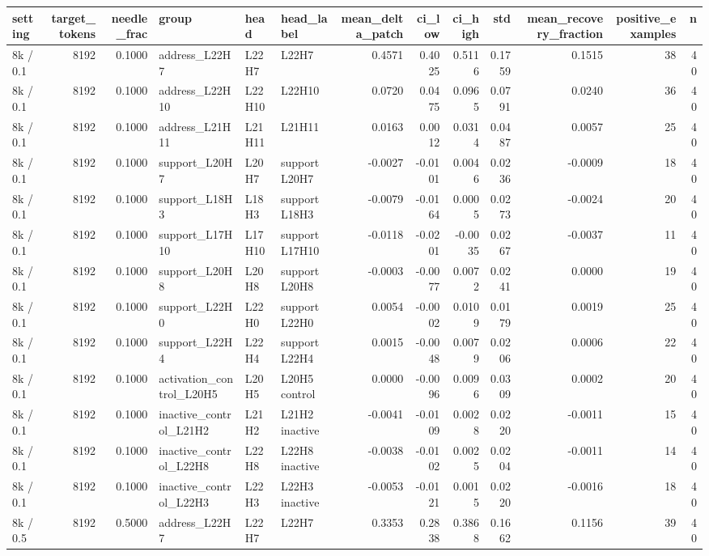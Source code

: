 \begin{tabular}{lrrlllrrrrrrr}
\toprule
setting & target_tokens & needle_frac & group & head & head_label & mean_delta_patch & ci_low & ci_high & std & mean_recovery_fraction & positive_examples & n \\
\midrule
8k / 0.1 & 8192 & 0.1000 & address_L22H7 & L22H7 & L22H7 & 0.4571 & 0.4025 & 0.5116 & 0.1759 & 0.1515 & 38 & 40 \\
8k / 0.1 & 8192 & 0.1000 & address_L22H10 & L22H10 & L22H10 & 0.0720 & 0.0475 & 0.0965 & 0.0791 & 0.0240 & 36 & 40 \\
8k / 0.1 & 8192 & 0.1000 & address_L21H11 & L21H11 & L21H11 & 0.0163 & 0.0012 & 0.0314 & 0.0487 & 0.0057 & 25 & 40 \\
8k / 0.1 & 8192 & 0.1000 & support_L20H7 & L20H7 & support L20H7 & -0.0027 & -0.0101 & 0.0046 & 0.0236 & -0.0009 & 18 & 40 \\
8k / 0.1 & 8192 & 0.1000 & support_L18H3 & L18H3 & support L18H3 & -0.0079 & -0.0164 & 0.0005 & 0.0273 & -0.0024 & 20 & 40 \\
8k / 0.1 & 8192 & 0.1000 & support_L17H10 & L17H10 & support L17H10 & -0.0118 & -0.0201 & -0.0035 & 0.0267 & -0.0037 & 11 & 40 \\
8k / 0.1 & 8192 & 0.1000 & support_L20H8 & L20H8 & support L20H8 & -0.0003 & -0.0077 & 0.0072 & 0.0241 & 0.0000 & 19 & 40 \\
8k / 0.1 & 8192 & 0.1000 & support_L22H0 & L22H0 & support L22H0 & 0.0054 & -0.0002 & 0.0109 & 0.0179 & 0.0019 & 25 & 40 \\
8k / 0.1 & 8192 & 0.1000 & support_L22H4 & L22H4 & support L22H4 & 0.0015 & -0.0048 & 0.0079 & 0.0206 & 0.0006 & 22 & 40 \\
8k / 0.1 & 8192 & 0.1000 & activation_control_L20H5 & L20H5 & L20H5 control & 0.0000 & -0.0096 & 0.0096 & 0.0309 & 0.0002 & 20 & 40 \\
8k / 0.1 & 8192 & 0.1000 & inactive_control_L21H2 & L21H2 & L21H2 inactive & -0.0041 & -0.0109 & 0.0028 & 0.0220 & -0.0011 & 15 & 40 \\
8k / 0.1 & 8192 & 0.1000 & inactive_control_L22H8 & L22H8 & L22H8 inactive & -0.0038 & -0.0102 & 0.0025 & 0.0204 & -0.0011 & 14 & 40 \\
8k / 0.1 & 8192 & 0.1000 & inactive_control_L22H3 & L22H3 & L22H3 inactive & -0.0053 & -0.0121 & 0.0015 & 0.0220 & -0.0016 & 18 & 40 \\
8k / 0.5 & 8192 & 0.5000 & address_L22H7 & L22H7 & L22H7 & 0.3353 & 0.2838 & 0.3868 & 0.1662 & 0.1156 & 39 & 40 \\

\end{tabular}
